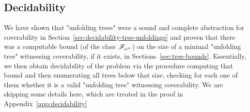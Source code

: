 \subsection{Decidability}
\label{sec:decidability-end}

We have shown that "unfolding trees" were a sound and complete abstraction for coverability in Section~\ref{sec:decidability-tree-unfoldings} and proven that there was a computable bound (of the class $\mathscr{F}_{\omega^\omega}$) on the size of a minimal "unfolding tree" witnessing coverability, if it exists, in Sections~\ref{sec:tree-bounds}. Essentially, we then obtain decidability of the problem via the procedure computing that bound and then enumerating all trees below that size, checking for each one of them whether it is a valid "unfolding tree" witnessing coverability. We are skipping some details here, which are treated in the proof in Appendix~\ref{app:decidability}

\decidablecover*


